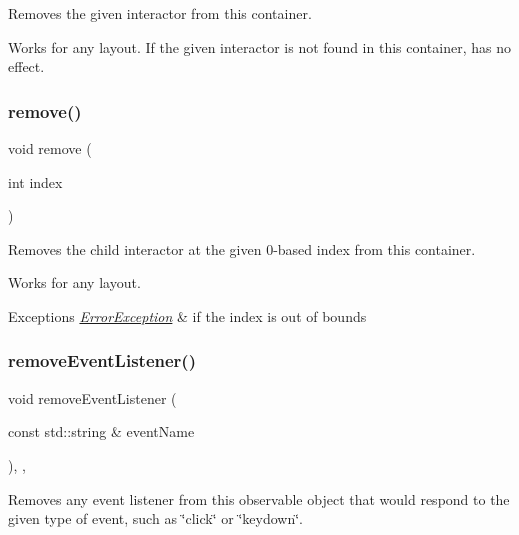 Removes the given interactor from this container. 

Works for any layout. If the given interactor is not found in this container, has no effect. \mbox{\label{classGContainer_a2ad1aa316f278b2e9fa8121504749652}} 
\subsubsection{\texorpdfstring{remove()}{remove()}\hspace{0.1cm}{\footnotesize\ttfamily [3/3]}}
{\footnotesize\ttfamily void remove (\begin{DoxyParamCaption}\item[{int}]{index }\end{DoxyParamCaption})\hspace{0.3cm}{\ttfamily [virtual]}}



Removes the child interactor at the given 0-\/based index from this container. 

Works for any layout. 
\begin{DoxyExceptions}{Exceptions}
{\em \mbox{\hyperlink{classErrorException}{Error\+Exception}}} & if the index is out of bounds \\
\hline
\end{DoxyExceptions}
\mbox{\label{classGObservable_acbcf1ed3a851ad8a3c17ef38d86b481d}} 
\subsubsection{\texorpdfstring{remove\+Event\+Listener()}{removeEventListener()}}
{\footnotesize\ttfamily void remove\+Event\+Listener (\begin{DoxyParamCaption}\item[{const std\+::string \&}]{event\+Name }\end{DoxyParamCaption})\hspace{0.3cm}{\ttfamily [protected]}, {\ttfamily [virtual]}, {\ttfamily [inherited]}}



Removes any event listener from this observable object that would respond to the given type of event, such as \char`\"{}click\char`\"{} or \char`\"{}keydown\char`\"{}. 

